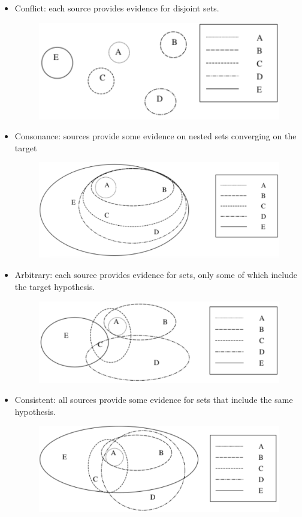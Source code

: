 \documentclass[12pt, a4paper]{report}
\theoremstyle{remark}
\begin{document}
    \begin{itemize}
        \item Conflict: each source provides evidence for disjoint sets. 
            \begin{figure}[H]
                \centering
                \includegraphics[width=0.5\linewidth]{images/conflict.png}
            \end{figure}
        \item Consonance: sources provide some evidence on nested sets converging on the target
            \begin{figure}[H]
                \centering
                \includegraphics[width=0.5\linewidth]{images/consonance.png}
            \end{figure}
        \item Arbitrary: each source provides evidence for sets, only some of which include the target hypothesis. 
            \begin{figure}[H]
                \centering
                \includegraphics[width=0.5\linewidth]{images/arbitrary.png}
            \end{figure}
        \item Consistent: all sources provide some evidence for sets that include the same hypothesis. 
            \begin{figure}[H]
                \centering
                \includegraphics[width=0.5\linewidth]{images/consistent.png}
            \end{figure}
    \end{itemize}
\end{document}
